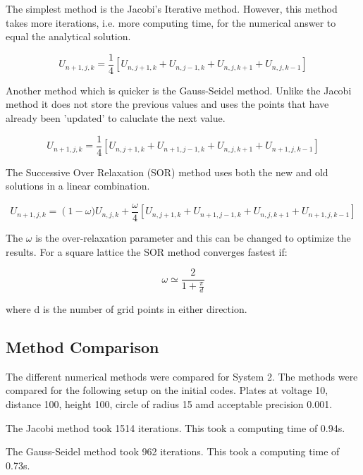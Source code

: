 \documentclass{article}
\begin{document}
The simplest method is the Jacobi's Iterative method. However, this method takes more iterations, i.e. more computing time, for the numerical answer to equal 
the analytical solution. 

\begin{equation} U_{n+1,j,k}=\frac{1}{4}\left [ U_{n,j+1,k} + U_{n,j-1,k} + U_{n,j,k+1} +U_{n,j,k-1}\right ]
\end{equation} 

Another method which is quicker is the Gauss-Seidel method. Unlike the Jacobi method it does not store the previous values and uses the points that have already been 'updated' to caluclate the next value.

\begin{equation}  
 U_{n+1,j,k}=\frac{1}{4}\left [ U_{n,j+1,k} + U_{n+1,j-1,k} + U_{n,j,k+1} +U_{n+1,j,k-1}\right ]
\end{equation}

The Successive Over Relaxation (SOR) method uses both the new and old solutions in a linear combination. 

\begin{equation}  
 U_{n+1,j,k}=\left (1-\omega)\right. U_{n,j,k}+\frac{\omega}{4}\left [ U_{n,j+1,k} + U_{n+1,j-1,k} + U_{n,j,k+1} +U_{n+1,j,k-1}\right ]
\end{equation}

The $\omega$ is the over-relaxation parameter and this can be changed to optimize the results. For a square lattice the SOR method converges fastest if: 

\begin{equation}
\omega \simeq \frac{2}{1 + \frac{\pi}{d}}
\end{equation}

where d is the number of grid points in either direction. \cite{numericalmethods}

\subsection{Method Comparison}

The different numerical methods were compared for System 2. The methods were compared for the following setup on the initial codes. Plates at voltage 10, distance 100, height 100, circle of radius 15 amd acceptable precision 0.001. 

The Jacobi method took 1514 iterations. This took a computing time of 0.94s.

The Gauss-Seidel method took 962 iterations. This took a computing time of 0.73s.
\end{document}
